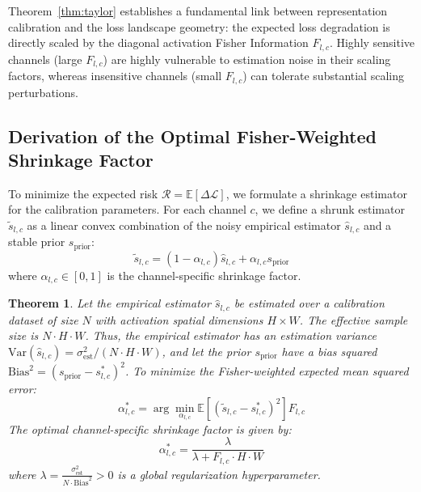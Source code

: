 \documentclass{article}
\theoremstyle{plain}
\newtheorem{theorem}{Theorem}[section]
\theoremstyle{definition}
\theoremstyle{remark}
\begin{document}
Theorem~\ref{thm:taylor} establishes a fundamental link between representation calibration and the loss landscape geometry: the expected loss degradation is directly scaled by the diagonal activation Fisher Information $F_{l,c}$. Highly sensitive channels (large $F_{l,c}$) are highly vulnerable to estimation noise in their scaling factors, whereas insensitive channels (small $F_{l,c}$) can tolerate substantial scaling perturbations.

\subsection{Derivation of the Optimal Fisher-Weighted Shrinkage Factor}

To minimize the expected risk $\mathcal{R} = \mathbb{E}[\Delta \mathcal{L}]$, we formulate a shrinkage estimator for the calibration parameters. For each channel $c$, we define a shrunk estimator $\tilde{s}_{l,c}$ as a linear convex combination of the noisy empirical estimator $\hat{s}_{l,c}$ and a stable prior $s_{\text{prior}}$:
\begin{equation}
    \tilde{s}_{l,c} = (1 - \alpha_{l,c})\hat{s}_{l,c} + \alpha_{l,c} s_{\text{prior}}
\end{equation}
where $\alpha_{l,c} \in [0, 1]$ is the channel-specific shrinkage factor.

\begin{theorem}
\label{thm:shrinkage}
Let the empirical estimator $\hat{s}_{l,c}$ be estimated over a calibration dataset of size $N$ with activation spatial dimensions $H \times W$. The effective sample size is $N \cdot H \cdot W$. Thus, the empirical estimator has an estimation variance $\text{Var}(\hat{s}_{l,c}) = \sigma^2_{\text{est}} / (N \cdot H \cdot W)$, and let the prior $s_{\text{prior}}$ have a bias squared $\text{Bias}^2 = (s_{\text{prior}} - s^*_{l,c})^2$. To minimize the Fisher-weighted expected mean squared error:
\begin{equation}
    \alpha_{l,c}^* = \arg\min_{\alpha_{l,c}} \mathbb{E}\left[ (\tilde{s}_{l,c} - s^*_{l,c})^2 \right] F_{l,c}
\end{equation}
The optimal channel-specific shrinkage factor is given by:
\begin{equation}
    \alpha_{l,c}^* = \frac{\lambda}{\lambda + F_{l,c} \cdot H \cdot W}
\end{equation}
where $\lambda = \frac{\sigma^2_{\text{est}}}{N \cdot \text{Bias}^2} > 0$ is a global regularization hyperparameter.
\end{theorem}
\end{document}
